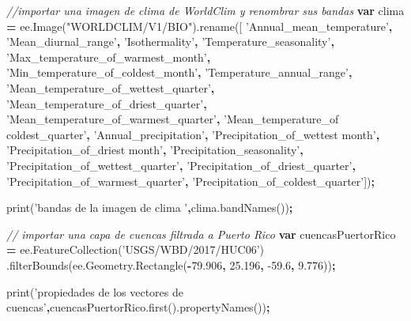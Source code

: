 \documentclass[
]{article}
\newenvironment{Shaded}{\begin{snugshade}}{\end{snugshade}}
\newcommand{\AttributeTok}[1]{\textcolor[rgb]{0.77,0.63,0.00}{#1}}
\newcommand{\CommentTok}[1]{\textcolor[rgb]{0.56,0.35,0.01}{\textit{#1}}}
\newcommand{\FloatTok}[1]{\textcolor[rgb]{0.00,0.00,0.81}{#1}}
\newcommand{\KeywordTok}[1]{\textcolor[rgb]{0.13,0.29,0.53}{\textbf{#1}}}
\newcommand{\NormalTok}[1]{#1}
\newcommand{\OperatorTok}[1]{\textcolor[rgb]{0.81,0.36,0.00}{\textbf{#1}}}
\newcommand{\StringTok}[1]{\textcolor[rgb]{0.31,0.60,0.02}{#1}}
\newcommand{\VariableTok}[1]{\textcolor[rgb]{0.00,0.00,0.00}{#1}}
\begin{document}
\begin{Shaded}
\begin{Highlighting}[]
\CommentTok{//importar una imagen de clima de WorldClim y renombrar sus bandas}
\KeywordTok{var}\NormalTok{ clima }\OperatorTok{=} \VariableTok{ee}\NormalTok{.}\AttributeTok{Image}\NormalTok{(}\StringTok{"WORLDCLIM/V1/BIO"}\NormalTok{).}\AttributeTok{rename}\NormalTok{([}
  \StringTok{'Annual_mean_temperature'}\OperatorTok{,}
  \StringTok{'Mean_diurnal_range'}\OperatorTok{,}
  \StringTok{'Isothermality'}\OperatorTok{,}
  \StringTok{'Temperature_seasonality'}\OperatorTok{,}
  \StringTok{'Max_temperature_of_warmest_month'}\OperatorTok{,}
  \StringTok{'Min_temperature_of_coldest_month'}\OperatorTok{,}
  \StringTok{'Temperature_annual_range'}\OperatorTok{,}
  \StringTok{'Mean_temperature_of_wettest_quarter'}\OperatorTok{,}
  \StringTok{'Mean_temperature_of_driest_quarter'}\OperatorTok{,}
  \StringTok{'Mean_temperature_of_warmest_quarter'}\OperatorTok{,}
  \StringTok{'Mean_temperature_of coldest_quarter'}\OperatorTok{,}
  \StringTok{'Annual_precipitation'}\OperatorTok{,}
  \StringTok{'Precipitation_of_wettest month'}\OperatorTok{,}
  \StringTok{'Precipitation_of_driest month'}\OperatorTok{,}
  \StringTok{'Precipitation_seasonality'}\OperatorTok{,}
  \StringTok{'Precipitation_of_wettest_quarter'}\OperatorTok{,}
  \StringTok{'Precipitation_of_driest_quarter'}\OperatorTok{,}
  \StringTok{'Precipitation_of_warmest_quarter'}\OperatorTok{,}
  \StringTok{'Precipitation_of_coldest_quarter'}\NormalTok{])}\OperatorTok{;}

\AttributeTok{print}\NormalTok{(}\StringTok{'bandas de la imagen de clima '}\OperatorTok{,}\VariableTok{clima}\NormalTok{.}\AttributeTok{bandNames}\NormalTok{())}\OperatorTok{;}

\CommentTok{// importar una capa de cuencas filtrada a Puerto Rico}
\KeywordTok{var}\NormalTok{ cuencasPuertorRico }\OperatorTok{=} \VariableTok{ee}\NormalTok{.}\AttributeTok{FeatureCollection}\NormalTok{(}\StringTok{'USGS/WBD/2017/HUC06'}\NormalTok{)}
\NormalTok{  .}\AttributeTok{filterBounds}\NormalTok{(}\VariableTok{ee}\NormalTok{.}\VariableTok{Geometry}\NormalTok{.}\AttributeTok{Rectangle}\NormalTok{(}\OperatorTok{-}\FloatTok{79.906}\OperatorTok{,} \FloatTok{25.196}\OperatorTok{,} \FloatTok{-59.6}\OperatorTok{,} \FloatTok{9.776}\NormalTok{))}\OperatorTok{;}

\AttributeTok{print}\NormalTok{(}\StringTok{'propiedades de los vectores de cuencas'}\OperatorTok{,}\VariableTok{cuencasPuertorRico}\NormalTok{.}\AttributeTok{first}\NormalTok{().}\AttributeTok{propertyNames}\NormalTok{())}\OperatorTok{;}


\end{Highlighting}
\end{Shaded}
\end{document}
